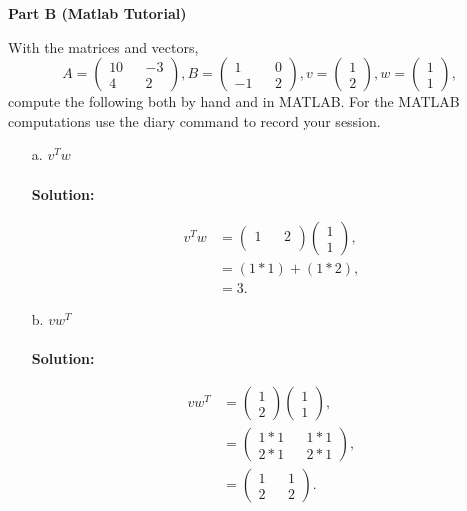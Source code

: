 \documentclass[12pt]{article}
\makeatletter
\theoremstyle{homework}
\newenvironment{exercise}[1]
{\def\@currentlabel{#1}\exercisecore}
{\endexercisecore}
\makeatother
\begin{document}
\textbf{Part B (Matlab Tutorial)}


\begin{exercise}{2} With the matrices and vectors,
\begin{equation*}
  A = 
  \begin{pmatrix}
    10 && -3 \\
    4 && 2 
  \end{pmatrix},
  B = 
  \begin{pmatrix}
    1 && 0 \\
    -1 && 2 
  \end{pmatrix},
    v = 
  \begin{pmatrix}
    1 \\
    2 
  \end{pmatrix},
    w = 
  \begin{pmatrix}
    1 \\
    1 
  \end{pmatrix},
\end{equation*}
 compute the following both by hand and in MATLAB. For the MATLAB computations use the diary command to record your session.
\begin{enumerate}
  \item[a.] $v^{T}w$\\\\
  \textbf{Solution:} 
  
  \begin{align*}
    v^{T}w &=
    \begin{pmatrix}
      1&&2 \\
    \end{pmatrix}
    \begin{pmatrix}
      1 \\
      1
    \end{pmatrix},\\
    &=
    (1*1)+(1*2),\\
    &= 3.
  \end{align*}
  
  \item[b.] $vw^{T}$\\\\
  \textbf{Solution:} 

  \begin{align*}
    vw^{T} &=
    \begin{pmatrix}
      1 \\
      2
    \end{pmatrix}
    \begin{pmatrix}
      1 \\
      1
    \end{pmatrix},\\
    &=
    \begin{pmatrix}
      1*1 && 1*1 \\
      2*1 && 2*1
    \end{pmatrix},
    \\
    &= \begin{pmatrix}
      1 && 1 \\
      2 && 2
    \end{pmatrix}.
  \end{align*}
  

\end{enumerate}
\end{exercise}
\end{document}
